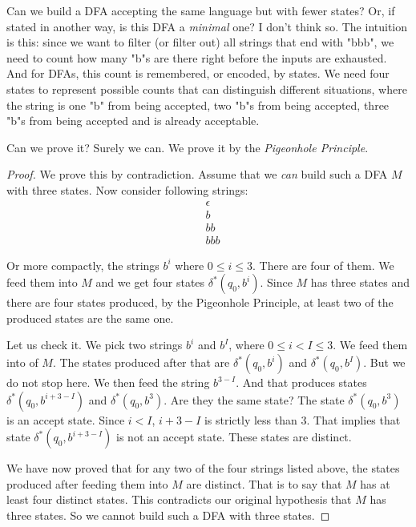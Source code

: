 \documentclass[11pt]{article}
\begin{document}
Can we build a DFA accepting the same language but with fewer states? Or, if stated in another way, is this DFA a \emph{minimal} one? I don't think so. The intuition is
this: since we want to filter (or filter out) all strings that end with "bbb", we
need to count how many "b"s are there right before the inputs are exhausted. And for
DFAs, this count is remembered, or encoded, by states. We need four states to
represent possible counts that can distinguish different situations, where the
string is one "b" from being accepted, two "b"s from being accepted, three "b"s from
being accepted and is already acceptable.

Can we prove it? Surely we can. We prove it by the \emph{Pigeonhole Principle}.

\begin{proof}
We prove this by contradiction. Assume that we \emph{can} build such a DFA $M$
with three states. Now consider following strings:
\begin{align*}
&\epsilon \\
&b \\
&bb \\
&bbb
\end{align*}

Or more compactly, the strings $b^i$ where $0 \leq i \leq 3$. There are four of
them. We feed them into $M$ and we get four states $\delta ^ \ast(q_0, b^i)$.
Since $M$ has three states and there are four states produced, by the
Pigeonhole Principle, at least two of the produced states are the same one.

Let us check it. We pick two strings $b^i$ and $b^I$, where $0 \leq i < I
\leq 3$. We feed them into of $M$. The states produced after that are $\delta ^
\ast(q_0, b^i)$ and $\delta ^ \ast(q_0, b^I)$. But we do not stop here. We then feed
the string $b^{3-I}$. And that produces states $\delta ^ \ast(q_0, b^{i + 3 - I})$
and $\delta ^ \ast(q_0, b^3)$. Are they the same state? The state $\delta ^
\ast(q_0, b^3)$ is an accept state. Since $i < I$, $i + 3 - I$ is strictly less
than $3$. That implies that state $\delta ^ \ast(q_0, b^{i + 3 - I})$ is not an
accept state. These states are distinct.

We have now proved that for any two of the four strings listed above, the states
produced after feeding them into $M$ are distinct. That is to say that $M$ has
at least four distinct states. This contradicts our original hypothesis that
$M$ has three states. So we cannot build such a DFA with three states.
\end{proof}
\end{document}
